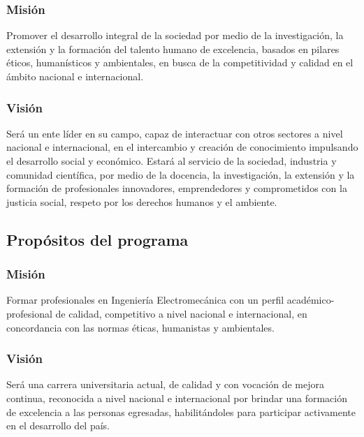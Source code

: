 \subsubsection*{Misión}

Promover el desarrollo integral de la sociedad por medio de la investigación, la extensión y la formación del talento humano de excelencia, basados en pilares éticos, humanísticos y ambientales, en busca de la competitividad y calidad en el ámbito nacional e internacional.\par

\subsubsection*{Visión}

Será un ente líder en su campo, capaz de interactuar con otros sectores a nivel nacional e internacional, en el intercambio y creación de conocimiento impulsando el desarrollo social y económico. Estará al servicio de la sociedad, industria y comunidad científica, por medio de la docencia, la investigación, la extensión y la formación de profesionales innovadores, emprendedores y comprometidos con la justicia social, respeto por los derechos humanos y el ambiente.\par

\subsection*{Propósitos del programa}

\subsubsection*{Misión}

Formar profesionales en Ingeniería Electromecánica con un perfil académico-profesional de calidad, competitivo a nivel nacional e internacional, en concordancia con las normas éticas, humanistas y ambientales.\par

\subsubsection*{Visión}

Será una carrera universitaria actual, de calidad y con vocación de mejora continua, reconocida a nivel nacional e internacional por brindar una formación de excelencia a las personas egresadas, habilitándoles para participar activamente en el desarrollo del país.\par


